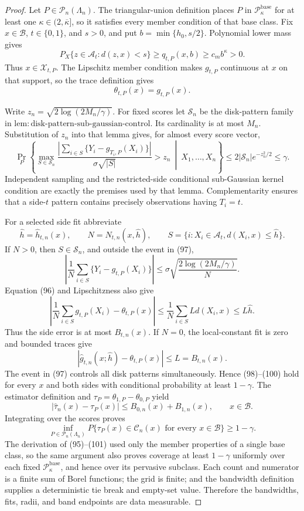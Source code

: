 \documentclass{article}
\begin{document}
\begin{proof}
Let \(P\in\mathcal P_n(\Lambda_n)\).  The triangular-union definition
places \(P\) in \(\mathcal P_{\kappa}^{\mathrm{base}}\) for at least one
\(\kappa\in(2,\overline\kappa]\), so it satisfies every member condition
of that base class.  Fix \(x\in\mathcal B\), \(t\in\{0,1\}\), and
\(s>0\), and put \(b=\min\{h_0,s/2\}\).  Polynomial lower mass gives
\[
 P_X\{z\in\mathcal A_t:d(z,x)<s\}
 \ge q_{t,P}(x,b)\ge c_mb^\kappa>0.
 \tag{95}
\]
Thus \(x\in\mathcal X_{t,P}\).  The Lipschitz member condition makes
\(g_{t,P}\) continuous at \(x\) on that support, so the trace definition
gives
\[
 \theta_{t,P}(x)=g_{t,P}(x).
 \tag{96}
\]

Write \(z_n=\sqrt{2\log(2M_n/\gamma)}\).  For fixed scores let
\(\mathscr S_n\) be the disk-pattern family in
\(\mathrm{lem:disk\text{-}pattern\text{-}sub\text{-}gaussian\text{-}control}\).
Its cardinality is at most \(M_n\).  Substitution of \(z_n\) into that
lemma gives, for almost every score vector,
\[
 \Pr_P\!\left\{
 \max_{S\in\mathscr S_n}
 \frac{|\sum_{i\in S}\{Y_i-g_{T_i,P}(X_i)\}|}
      {\sigma\sqrt{|S|}}>z_n
 \ \middle|\ X_1,\ldots,X_n\right\}
 \le2|\mathscr S_n|e^{-z_n^2/2}\le\gamma.
 \tag{97}
\]
Independent sampling and the restricted-side conditional sub-Gaussian
kernel condition are exactly the premises used by that lemma.
Complementarity ensures that a side-\(t\) pattern contains precisely
observations having \(T_i=t\).

For a selected side fit abbreviate
\[
 \widehat h=\widehat h_{t,n}(x),\qquad
 N=N_{t,n}(x,\widehat h),\qquad
 S=\{i:X_i\in\mathcal A_t, d(X_i,x)\le\widehat h\}.
\]
If \(N>0\), then \(S\in\mathscr S_n\), and outside the event in (97),
\[
 \left|\frac1N\sum_{i\in S}\{Y_i-g_{t,P}(X_i)\}\right|
 \le\sigma\sqrt{\frac{2\log(2M_n/\gamma)}N}.
 \tag{98}
\]
Equation (96) and Lipschitzness also give
\[
 \left|\frac1N\sum_{i\in S}g_{t,P}(X_i)-\theta_{t,P}(x)\right|
 \le\frac1N\sum_{i\in S}Ld(X_i,x)
 \le L\widehat h.
 \tag{99}
\]
Thus the side error is at most \(B_{t,n}(x)\).  If \(N=0\), the
local-constant fit is zero and bounded traces give
\[
 |\widehat g_{t,n}(x;\widehat h)-\theta_{t,P}(x)|
 \le L=B_{t,n}(x).
 \tag{100}
\]
The event in (97) controls all disk patterns simultaneously.  Hence
(98)--(100) hold for every \(x\) and both sides with conditional
probability at least \(1-\gamma\).  The estimator definition and
\(\tau_P=\theta_{1,P}-\theta_{0,P}\) yield
\[
 |\widehat\tau_n(x)-\tau_P(x)|
 \le B_{0,n}(x)+B_{1,n}(x),
 \qquad x\in\mathcal B.
 \tag{101}
\]
Integrating over the scores proves
\[
 \inf_{P\in\mathcal P_n(\Lambda_n)}
 P\{\tau_P(x)\in\mathcal C_n(x)\text{ for every }x\in\mathcal B\}
 \ge1-\gamma.
 \tag{102}
\]
The derivation of (95)--(101) used only the member properties of a single
base class, so the same argument also proves coverage at least
\(1-\gamma\) uniformly over each fixed
\(\mathcal P_\kappa^{\mathrm{base}}\), and hence over its pervasive
subclass.
Each count and numerator is a finite sum of Borel functions; the grid is
finite; and the bandwidth definition supplies a deterministic tie break
and empty-set value.  Therefore the bandwidths, fits, radii, and band
endpoints are data measurable.


\end{proof}
\end{document}
